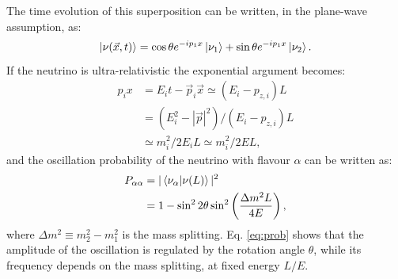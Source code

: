 The time evolution of this superposition can be written, in the plane-wave assumption, as:
\begin{equation}
    \ket{\nu(\vec{x},t)} = \cos\theta e^{-ip_{1}x}\ket{\nu_{1}}+\sin\theta e^{-ip_{1}x}\ket{\nu_{2}}.
\end{equation}
If the neutrino is ultra-relativistic the exponential argument becomes:
\begin{equation}
\begin{split}
    p_{i}x & = E_{i}t - \vec{p}_{i}\vec{x} \simeq (E_{i}-p_{z,i})L\\
           & = (E_{i}^2-|\vec{p}|^{2})/(E_{i}-p_{z,i})L\\
           & \simeq m_i^{2}/2E_{i}L \simeq m_i^{2}/2E L,
\end{split}
\end{equation}
and the oscillation probability of the neutrino with flavour $\alpha$ can be written as:
\begin{equation}
\begin{split}
    P_{\alpha\alpha} & = |\bra{\nu_{\alpha}}\ket{\nu(L)}|^2\\
                     & = 1 - \sin^2 2\theta \sin^2\left(\frac{\Delta m^{2}L}{4E}\right),\label{eq:prob}
\end{split}
\end{equation}
where $\Delta m^{2} \equiv m^2_2-m^2_1$ is the mass splitting. Eq. \eqref{eq:prob} shows that the amplitude of the oscillation is regulated by the rotation angle $\theta$, while its frequency depends on the mass splitting, at fixed energy $L/E$.

